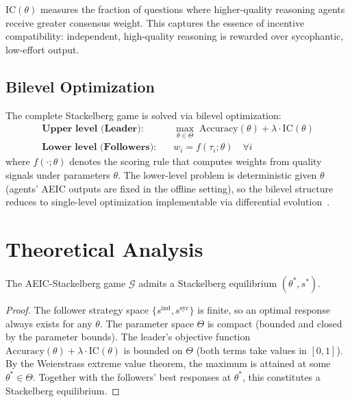 \documentclass[runningheads]{llncs}
\begin{document}
$\text{IC}(\theta)$ measures the fraction of questions where higher-quality reasoning agents receive greater consensus weight. This captures the essence of incentive compatibility: independent, high-quality reasoning is rewarded over sycophantic, low-effort output.

\subsection{Bilevel Optimization}

The complete Stackelberg game is solved via bilevel optimization:
\begin{align}
    \textbf{Upper level (Leader):} \quad & \max_{\theta \in \Theta} \; \text{Accuracy}(\theta) + \lambda \cdot \text{IC}(\theta) \label{eq:upper} \\
    \textbf{Lower level (Followers):} \quad & w_i = f(\tau_i; \theta) \quad \forall i \label{eq:lower}
\end{align}
where $f(\cdot; \theta)$ denotes the scoring rule that computes weights from quality signals under parameters $\theta$. The lower-level problem is deterministic given $\theta$ (agents' AEIC outputs are fixed in the offline setting), so the bilevel structure reduces to single-level optimization implementable via differential evolution~\cite{storn1997differential}.

\section{Theoretical Analysis}
\label{sec:theory}

\begin{theorem}
\label{thm:existence}
The AEIC-Stackelberg game $\mathcal{G}$ admits a Stackelberg equilibrium $(\theta^*, s^*)$.
\end{theorem}

\begin{proof}
The follower strategy space $\{s^{\text{ind}}, s^{\text{syc}}\}$ is finite, so an optimal response always exists for any $\theta$. The parameter space $\Theta$ is compact (bounded and closed by the parameter bounds). The leader's objective function $\text{Accuracy}(\theta) + \lambda \cdot \text{IC}(\theta)$ is bounded on $\Theta$ (both terms take values in $[0,1]$). By the Weierstrass extreme value theorem, the maximum is attained at some $\theta^* \in \Theta$. Together with the followers' best responses at $\theta^*$, this constitutes a Stackelberg equilibrium.
\end{proof}
\end{document}
